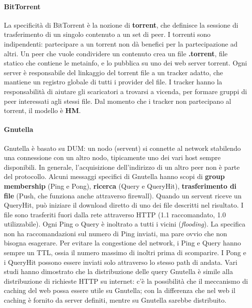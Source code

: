 \documentclass[11pt]{article}
\begin{document}
\paragraph{BitTorrent} La specificità di BitTorrent è la nozione di \textbf{torrent}, che definisce la sessione di trasferimento di un singolo contenuto a un set di peer. I torrenti sono indipendenti: partecipare a un torrent non dà benefici per la partecipazione ad altri. Un peer che vuole condividere un contenuto crea un file \textbf{.torrent}, file statico che contiene le metainfo, e lo pubblica su uno dei web server torrent. Ogni server è responsabile del linkaggio del torrent file a un tracker adatto, che mantiene un registro globale di tutti i provider del file. I tracker hanno la responsabilità di aiutare gli scaricatori a trovarsi a vicenda, per formare gruppi di peer interessati agli stessi file. Dal momento che i tracker non partecipano al torrent, il modello è \textbf{HM}.

\paragraph{Gnutella} Gnutella è basato su DUM: un nodo (servent) si connette al network stabilendo una connessione con un altro nodo, tipicamente uno dei vari host sempre disponibili. In generale, l'acquisizione dell'indirizzo di un altro peer non è parte del protocollo. Alcuni messaggi specifici di Gnutella hanno scopi di \textbf{group membership} (Ping e Pong), \textbf{ricerca} (Query e QueryHit), \textbf{trasferimento di file} (Push, che funziona anche attraverso firewall). Quando un servent riceve un QueryHit, può iniziare il download diretto di uno dei file descritti nel risultato. I file sono trasferiti fuori dalla rete attraverso HTTP (1.1 raccomandato, 1.0 utilizzabile). Ogni Ping o Query è inoltrato a tutti i vicini (\textit{flooding}). La specifica non ha raccomandazioni sul numero di Ping inviati, ma pare ovvio che non bisogna esagerare. Per evitare la congestione del network, i Ping e Query hanno sempre un TTL, ossia il numero massimo di inoltri prima di scomparire. I Pong e i QueryHit possono essere inviati solo attraverso lo stesso path di andata. Vari studi hanno dimostrato che la distribuzione delle query Gnutella è simile alla distribuzione di richieste HTTP su internet: c'è la possibilità che il meccanismo di caching del web possa essere utile su Gnutella; con la differenza che nel web il caching è fornito da server definiti, mentre su Gnutella sarebbe distribuito.
\end{document}
